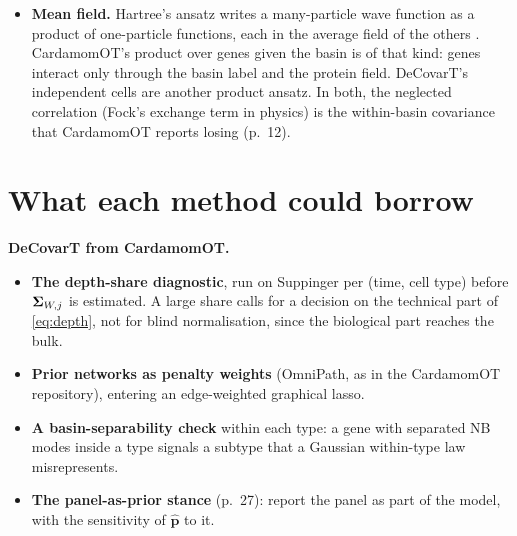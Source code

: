 \documentclass[11pt,a4paper]{article}
\begin{document}
\begin{specbox}
\begin{itemize}
        depends on $\bm p$ . No full Bayesian treatment is needed.
  \item \textbf{Mean field.} Hartree's ansatz writes a many-particle wave function as a product of
        one-particle functions, each in the average field of the others \parencite{hartreeWaveMechanicsAtom1928,fockNaherungsmethodeZurLosung1930}.
        CardamomOT's product over genes given the basin is of that kind: genes interact only through the
        basin label and the protein field. DeCovarT's independent cells are another product ansatz. In
        both, the neglected correlation (Fock's exchange term in physics) is the within-basin covariance
        that CardamomOT reports losing (p.~12).
\end{itemize}
\end{specbox}

\section{What each method could borrow}\label{sec:borrow}

\textbf{DeCovarT from CardamomOT.}
\begin{itemize}
  \item \textbf{The depth-share diagnostic}, run on Suppinger per (time, cell type) before $\bm{\Sigma}_{W,j}$ is
        estimated. A large share calls for a decision on the technical part of \cref{eq:depth}, not for
        blind normalisation, since the biological part reaches the bulk.
  \item \textbf{Prior networks as penalty weights} (OmniPath, as in the CardamomOT repository), entering
        an edge-weighted graphical lasso.
  \item \textbf{A basin-separability check} within each type: a gene with separated NB modes inside a type
        signals a subtype that a Gaussian within-type law misrepresents.
  \item \textbf{The panel-as-prior stance} (p.~27): report the panel as part of the model, with the
        sensitivity of $\hat{\bm p}$ to it.
\end{itemize}
\end{document}
